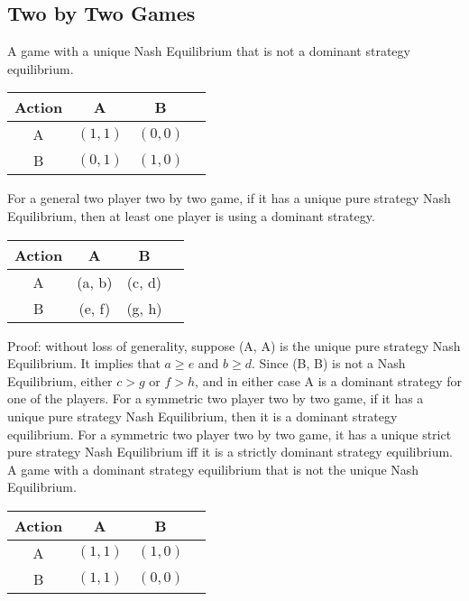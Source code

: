 \documentclass{article}
\begin{document}
\subsection{Two by Two Games}
A game with a unique Nash Equilibrium that is not a dominant strategy equilibrium.
\begin{center} \begin{tabular}{|c|c|c|c|}
\hline
 Action &A &B\\ \hline
A &$\left(1, 1\right)$ &$\left(0, 0\right)$\\ \hline
B &$\left(0, 1\right)$ &$\left(1, 0\right)$\\ \hline
\end{tabular} \end{center}
For a general two player two by two game, if it has a unique pure strategy Nash Equilibrium, then at least one player is using a dominant strategy.
\begin{center} \begin{tabular}{|c|c|c|c|}
\hline
 Action &A &B\\ \hline
A &(a, b) &(c, d)\\ \hline
B &(e, f) &(g, h)\\ \hline
\end{tabular} \end{center}
Proof: without loss of generality, suppose (A, A) is the unique pure strategy Nash Equilibrium. It implies that $a \geq  e$ and $b \geq  d$. Since (B, B) is not a Nash Equilibrium, either $c > g$ or $f > h$, and in either case A is a dominant strategy for one of the players.
\newline \newline
For a symmetric two player two by two game, if it has a unique pure strategy Nash Equilibrium, then it is a dominant strategy equilibrium.
\newline \newline
For a symmetric two player two by two game, it has a unique strict pure strategy Nash Equilibrium iff it is a strictly dominant strategy equilibrium.
\newline \newline
A game with a dominant strategy equilibrium that is not the unique Nash Equilibrium.
\begin{center} \begin{tabular}{|c|c|c|c|}
\hline
 Action &A &B\\ \hline
A &$\left(1, 1\right)$ &$\left(1, 0\right)$\\ \hline
B &$\left(1, 1\right)$ &$\left(0, 0\right)$\\ \hline
\end{tabular} \end{center}
\end{document}
